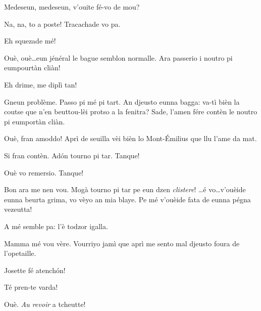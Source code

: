 \begin{drama}
\Feliespeaks {} Medeseun, medeseun, v'ouite fé-vo de mou?

\MedMitchospeaks  Na, na, to a poste! Tracachade vo pa. 


\Casimirspeaks{} Eh squezade mé!

\MedMitchospeaks Ouè, ouè\ldots eun jénéral le bague semblon normalle. Ara passerio i noutro pi eumpourtàn cliàn!


\Eunfeurmispeaks Eh drime, me diplì tan!

\MedMitchospeaks Gneun problème. Passo pi mé pi tart. An djeusto eunna bagga: va-tì bièn la coutse que n’en beuttou-lèi protso a la fenitra? Sade, l’amen fére contèn le noutro pi eumportàn cliàn.

\Eunfeurmispeaks Ouè, fran amoddo! Aprì de seuilla vèi bièn lo Mont-\'Emilius que llu l’ame da mat.

\MedMitchospeaks Si fran contèn. Ad\'on tourno pi tar. Tanque!

\Eunfeurmispeaks Ouè vo remersio. Tanque!


\MedMitchospeaks{} Bon ara me nen vou. Mogà tourno pi tar pe eun dzen \textit{clistere}!  \ldots é vo\ldots v'ouèide eunna beurta grima, vo vèyo an mia blaye. Pe mé v'ouèide fata de eunna pégna vezeutta!

\Gerominespeaks A mé semble pa: l’è todzor igalla.

\Feliespeaks Mamma mé vou vère. Vourriyo jamì que aprì me sento mal djeusto foura de l’opetaille. 

\Gerominespeaks Josette fé atench\'on!


\Gerominespeaks {} Té pren-te varda!

\MedMitchospeaks Ouè.  \textit{Au revoir} a tcheutte!


\scene[-- Lo motchaou]



\end{drama}
